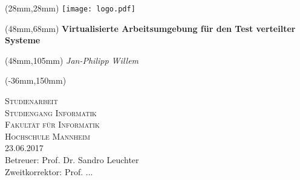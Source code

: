 %
% 
%
 
\begin{titlepage}
\begin{textblock*}{130mm}(28mm,28mm) %
  {\texttt{[image: logo.pdf]}}
\end{textblock*}%
\begin{textblock*}{130mm}(48mm,68mm) %
	\centering\huge\bfseries
	Virtualisierte Arbeitsumgebung für den Test verteilter Systeme
\end{textblock*}%

\begin{textblock*}{130mm}(48mm,105mm)
	\centering\Large\itshape 
	Jan-Philipp Willem
\end{textblock*}

\begin{textblock*}{297mm}(-36mm,150mm) %
	\begin{center}
		{\scshape\Large Studienarbeit\\ Studiengang Informatik}\\
		\vspace{2cm}
		{\scshape\large Fakultät für Informatik\\Hochschule Mannheim}\\
		\vspace{2cm}
		{\large 23.06.2017} \\ %
		\vspace{3,5cm}
		{\large Betreuer: Prof. Dr. Sandro Leuchter\\
		Zweitkorrektor: Prof. ...}
	\end{center}
\end{textblock*}
\end{titlepage}
\null
\newpage
